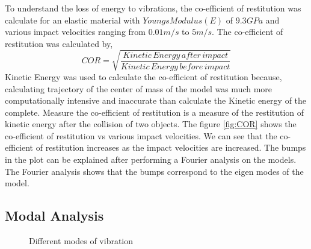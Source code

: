 To understand the loss of energy to vibrations, the co-efficient of restitution was calculate for an elastic material with $Youngs Modulus(E)$ of $9.3GPa$ and various impact velocities ranging from $0.01m/s$ to $5m/s$.
The co-efficient of restitution was calculated by,
\begin{equation}
COR = \sqrt{\frac{Kinetic\, Energy\, after\, impact}{Kinetic\, Energy\, before\, impact}}
\end{equation}
Kinetic Energy was used to calculate the co-efficient of restitution because, calculating trajectory of the center of mass of the model was much more computationally intensive and inaccurate than calculate the Kinetic energy of the complete.
Measure the co-efficient of restitution is a measure of the restitution of kinetic energy after the collision of two objects. The figure \ref{fig:COR} shows the co-efficient of restitution vs various impact velocities. We can see that the co-efficient of restitution increases as the impact velocities are increased. The bumps in the plot can be explained after performing a Fourier analysis on the models. The Fourier analysis shows that the bumps correspond to the eigen modes of the model.

\subsection{Modal Analysis}


\begin{figure}[H]
\centering
{}
\caption{Different modes of vibration}
\label{fig:modes}
\end{figure}


